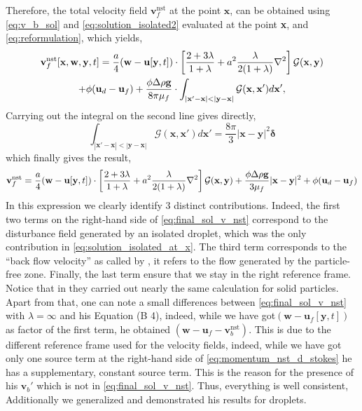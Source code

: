 Therefore, the total velocity field $\textbf{v}^\text{nst}_f$ at the point $\textbf{x}$, can be obtained using \ref{eq:v_b_sol} and \ref{eq:solution_isolated2} evaluated at the point \textbf{x}, and  \ref{eq:reformulation}, which yields,  
\begin{multline}
    \textbf{v}^\text{nst}_f [\textbf{x},\textbf{w},\textbf{y},t]
    =
    \frac{a}{4}(\textbf{w}- \textbf{u}[\textbf{y},t])\cdot\left[
        \frac{2+3\lambda}{1+\lambda}
        +
        a^2\frac{\lambda}{2(1+\lambda)}\mathbf{\nabla}^2 
    \right]\mathcal{G}(\textbf{x},\textbf{y})\\
    +
    \phi(\textbf{u}_d - \textbf{u}_f)
    + 
    \frac{\phi\Delta \rho \textbf{g}}{8\pi \mu_f}\cdot 
    \int_{|\textbf{x}'-\textbf{x}|< |\textbf{y}- \textbf{x}|}
    \mathcal{G}(\textbf{x},\textbf{x}')
    d\textbf{x}',
\end{multline}
Carrying out the integral on the second line gives directly,
\begin{equation}
    \int_{|\textbf{x}'-\textbf{x}|< |\textbf{y}- \textbf{x}|}
    \mathcal{G}(\textbf{x},\textbf{x}')
    d\textbf{x}'
    = \frac{8\pi}{3}|\textbf{x}- \textbf{y}|^2\bm\delta
\end{equation}
which finally gives the result, 
\begin{multline}
    \textbf{v}^\text{nst}_f
    =
    \frac{a}{4}(\textbf{w}- \textbf{u}[\textbf{y},t])\cdot\left[
        \frac{2+3\lambda}{1+\lambda}
        +
        a^2\frac{\lambda}{2(1+\lambda)}\grad^2 
    \right]\mathcal{G}(\textbf{x},\textbf{y})
    + 
    \frac{\phi\Delta \rho \textbf{g}}{3\mu_f} |\textbf{x}-\textbf{y}|^2
    +
    \phi(\textbf{u}_d - \textbf{u}_f)
    \label{eq:final_sol_v_nst}
\end{multline}
In this expression we clearly identify $3$ distinct contributions. 
Indeed, the first two terms on the right-hand side of \ref{eq:final_sol_v_nst} correspond to the disturbance field generated by an isolated droplet, which was the only contribution in \ref{eq:solution_isolated_at_x}. 
The third term corresponds to the ``back flow velocity'' as called by \citet{zhang2021ensemble}, it refers to the flow generated by the particle-free zone. 
Finally, the last term ensure that we stay in the right reference frame. 
Notice that in \citet[Appendix A]{zhang2021ensemble} they carried out nearly the same calculation for solid particles.
Apart from that, one can note a small differences between \ref{eq:final_sol_v_nst} with $\lambda = \infty$ and his Equation (B 4), indeed, while we have got$(\textbf{w}- \textbf{u}_f[\textbf{y},t])$ as factor of the first term, he obtained $(\textbf{w}- \textbf{u}_f - \textbf{v}_b^\text{nst})$. 
This is due to the different reference frame used for the velocity fields, indeed, while we have got only one source term at the right-hand side of \ref{eq:momentum_nst_d_stokes} he has a supplementary, constant source term. 
This is the reason for the presence of his $\textbf{v}_b'$ which is not in \ref{eq:final_sol_v_nst}. 
Thus, everything is well consistent, Additionally we generalized and demonstrated his results for droplets. 


